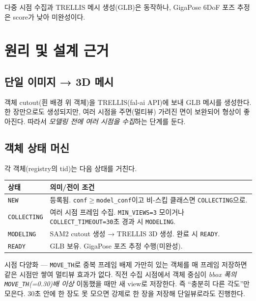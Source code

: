 \begin{statuswip}
다중 시점 수집과 TRELLIS 메시 생성(GLB)은 동작하나, GigaPose 6DoF 포즈 추정은
score가 낮아 미완성이다.
\end{statuswip}

\chapter{원리 및 설계 근거}

\section{단일 이미지 → 3D 메시}
객체 cutout(흰 배경 위 객체)을 TRELLIS(fal-ai API)에 보내 GLB 메시를 생성한다.
한 장만으로도 생성되지만, 여러 시점을 주면(멀티뷰) 가려진 면이 보완되어 형상이
좋아진다. 따라서 \emph{모델링 전에 여러 시점을 수집}하는 단계를 둔다.

\section{객체 상태 머신}
각 객체(registry의 tid)는 다음 상태를 거친다.
\begin{center}
\begin{tabular}{@{}lp{9cm}@{}}
\toprule
상태 & 의미/전이 조건 \\
\midrule
\texttt{NEW}        & 등록됨. \texttt{conf}$\ge$\texttt{model\_conf}이고 비-스킵
                      클래스면 \texttt{COLLECTING}으로. \\
\texttt{COLLECTING} & 여러 시점 프레임 수집. \texttt{MIN\_VIEWS=3} 모이거나
                      \texttt{COLLECT\_TIMEOUT=30}초 경과 시 \texttt{MODELING}. \\
\texttt{MODELING}   & SAM2 cutout 생성 → TRELLIS 3D 생성. 완료 시 \texttt{READY}. \\
\texttt{READY}      & GLB 보유. GigaPose 포즈 추정 수행(미완성). \\
\bottomrule
\end{tabular}
\end{center}

\begin{designbox}{시점 다양화 — \texttt{MOVE\_TH}로 중복 프레임 배제}
가만히 있는 객체를 매 프레임 저장하면 같은 시점만 쌓여 멀티뷰 효과가 없다.
직전 수집 시점에서 객체 중심이 \emph{bbox 폭의 \texttt{MOVE\_TH}(=0.30)배 이상}
이동했을 때만 새 view로 저장한다. 즉 ``충분히 다른 각도''만 모은다. 30초 안에
한 장도 못 모으면 강제로 한 장을 저장해 단일뷰로라도 진행한다.
\end{designbox}

